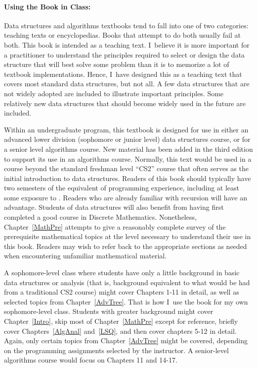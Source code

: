 \paragraph{Using the Book in Class:}
Data structures and algorithms textbooks tend to fall into one of two
categories: teaching texts or encyclopedias.
Books that attempt to do both usually fail at both.
This book is intended as a teaching text.
I~believe it is more important for a practitioner to understand
the principles required to select or design the data structure that
will best solve some problem than it is to memorize a lot of textbook
implementations.
Hence, I~have designed this as a teaching text that covers most
standard data structures, but not all.
A few data structures that are not widely adopted are included
to illustrate important principles.
Some relatively new data structures that should
become widely used in the future are included.

Within an undergraduate program, this textbook is designed for use in
either an advanced lower division (sophomore or junior level) data
structures course, or for a senior level algorithms course.
New material has been added in the third edition to support its use in
an algorithms course.
Normally, this text would be used in a course beyond the standard
freshman level ``CS2'' course that often serves as the initial
introduction to data structures.
Readers of this book should typically have two semesters of the
equivalent of programming experience,
including at least some exposure to \Lang. %
Readers who are already familiar with recursion will
have an advantage.
Students of data structures will also benefit from having first
completed a good course in Discrete
Mathematics.
Nonetheless, Chapter~\ref{MathPre} attempts to give a reasonably
complete survey of the prerequisite mathematical topics at the level
necessary to understand their use in this book.
Readers may wish to refer back to the appropriate sections as
needed when encountering unfamiliar mathematical material.

A sophomore-level class where students have only a little background
in basic data structures or analysis (that is, background equivalent
to what would be had from a traditional CS2 course)
might cover Chapters 1-11 in detail,
as well as selected topics from Chapter~\ref{AdvTree}.
That is how I~use the book for my own sophomore-level class.
Students with greater background might cover Chapter~\ref{Intro},
skip most of Chapter~\ref{MathPre} except for reference, briefly cover
Chapters~\ref{AlgAnal} and~\ref{LSQ},
and then cover chapters 5-12 in detail.
Again, only certain topics from Chapter~\ref{AdvTree} might be covered,
depending on the programming assignments selected by the instructor.
A senior-level algorithms course would focus on Chapters 11 and 14-17.

